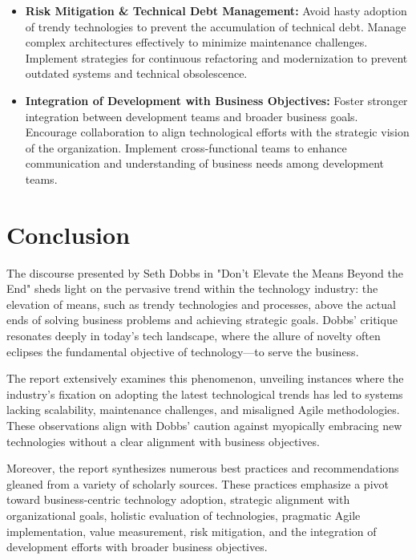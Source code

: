 \documentclass[a4Paper]{article}
\begin{document}
\begin{itemize}
    \item \textbf{Risk Mitigation \& Technical Debt Management:} \cite{anzoategui2019endogenous, parthasarthy2018impact} Avoid hasty adoption of trendy technologies to prevent the accumulation of technical debt. Manage complex architectures effectively to minimize maintenance challenges. Implement strategies for continuous refactoring and modernization to prevent outdated systems and technical obsolescence.
    
    \item \textbf{Integration of Development with Business Objectives:} \cite{rahimi2016business, sjodin2020agile} Foster stronger integration between development teams and broader business goals. Encourage collaboration to align technological efforts with the strategic vision of the organization. Implement cross-functional teams to enhance communication and understanding of business needs among development teams.
\end{itemize}

\section{Conclusion}
The discourse presented by Seth Dobbs in "Don’t Elevate the Means Beyond the End" sheds light on the pervasive trend within the technology industry: the elevation of means, such as trendy technologies and processes, above the actual ends of solving business problems and achieving strategic goals. Dobbs' critique resonates deeply in today's tech landscape, where the allure of novelty often eclipses the fundamental objective of technology—to serve the business.

The report extensively examines this phenomenon, unveiling instances where the industry's fixation on adopting the latest technological trends has led to systems lacking scalability, maintenance challenges, and misaligned Agile methodologies. These observations align with Dobbs' caution against myopically embracing new technologies without a clear alignment with business objectives.

Moreover, the report synthesizes numerous best practices and recommendations gleaned from a variety of scholarly sources. These practices emphasize a pivot toward business-centric technology adoption, strategic alignment with organizational goals, holistic evaluation of technologies, pragmatic Agile implementation, value measurement, risk mitigation, and the integration of development efforts with broader business objectives.
\end{document}
